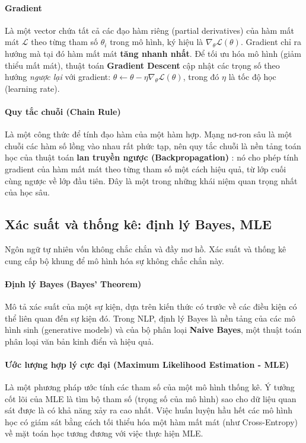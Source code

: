 \paragraph{Gradient}
Là một vector chứa tất cả các đạo hàm riêng (partial derivatives) của hàm mất mát $\mathcal{L}$ theo từng tham số $\theta_i$ trong mô hình, ký hiệu là $\nabla_{\theta}\mathcal{L}(\theta)$. Gradient chỉ ra hướng mà tại đó hàm mất mát \textbf{tăng nhanh nhất}. Để tối ưu hóa mô hình (giảm thiểu mất mát), thuật toán \textbf{Gradient Descent} cập nhật các trọng số theo hướng \textit{ngược lại} với gradient: $\theta \leftarrow \theta - \eta \nabla_{\theta}\mathcal{L}(\theta)$, trong đó $\eta$ là tốc độ học (learning rate).

\paragraph{Quy tắc chuỗi (Chain Rule)}
Là một công thức để tính đạo hàm của một hàm hợp. Mạng nơ-ron sâu là một chuỗi các hàm số lồng vào nhau rất phức tạp, nên quy tắc chuỗi là nền tảng toán học của thuật toán \textbf{lan truyền ngược (Backpropagation)} \cite{rumelhart1986learning}: nó cho phép tính gradient của hàm mất mát theo từng tham số một cách hiệu quả, từ lớp cuối cùng ngược về lớp đầu tiên. Đây là một trong những khái niệm quan trọng nhất của học sâu.

\subsection{Xác suất và thống kê: định lý Bayes, MLE}
\label{ssec:xac_suat_thong_ke}
Ngôn ngữ tự nhiên vốn không chắc chắn và đầy mơ hồ. Xác suất và thống kê cung cấp bộ khung để mô hình hóa sự không chắc chắn này.

\paragraph{Định lý Bayes (Bayes' Theorem)}
Mô tả xác suất của một sự kiện, dựa trên kiến thức có trước về các điều kiện có thể liên quan đến sự kiện đó. Trong NLP, định lý Bayes là nền tảng của các mô hình sinh (generative models) và của bộ phân loại \textbf{Naive Bayes}, một thuật toán phân loại văn bản kinh điển và hiệu quả.

\paragraph{Ước lượng hợp lý cực đại (Maximum Likelihood Estimation - MLE)}
Là một phương pháp ước tính các tham số của một mô hình thống kê. Ý tưởng cốt lõi của MLE là tìm bộ tham số (trọng số của mô hình) sao cho dữ liệu quan sát được là có khả năng xảy ra cao nhất. Việc huấn luyện hầu hết các mô hình học có giám sát bằng cách tối thiểu hóa một hàm mất mát (như Cross-Entropy) về mặt toán học tương đương với việc thực hiện MLE.

